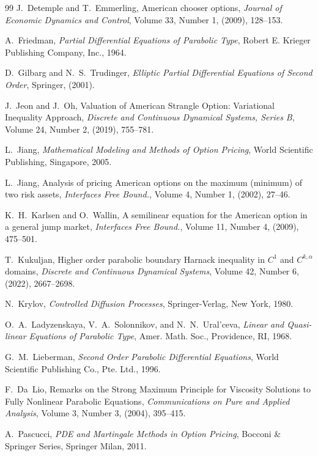 \documentclass[11pt, a4paper, leqno]{amsart}
\numberwithin{equation}{section}
\theoremstyle{plain}
\theoremstyle{definition}
\theoremstyle{remark}
\begin{document}
\begin{thebibliography}{99}
	J.~Detemple and T.~Emmerling, {American chooser options}, \textit{Journal of Economic Dynamics and Control}, Volume 33, Number 1, (2009), 128--153.
	
	A.~Friedman, \textit{Partial Differential Equations of Parabolic Type}, Robert E. Krieger Publishing Company, Inc., 1964.

	
	D.~Gilbarg and N.~S.~Trudinger, \textit{Elliptic Partial Differential Equations of Second Order}, Springer, (2001).
	
	J.~Jeon and J.~Oh, Valuation of American Strangle Option: Variational Inequality Approach, \textit{Discrete and Continuous Dynamical Systems, Series B}, Volume 24, Number 2, (2019), 755--781.
	
	L.~Jiang, \textit{Mathematical Modeling and Methods of Option Pricing}, World Scientific Publishing, Singapore, 2005.
	
	L.~Jiang, Analysis of pricing American options on the maximum (minimum) of two risk assets, \textit{Interfaces Free Bound.}, Volume 4, Number 1, (2002), 27--46.
	
	K.~H.~Karlsen and O.~Wallin, A semilinear equation for the American option in a general jump market, \textit{Interfaces Free Bound.}, Volume 11, Number 4, (2009), 475--501.

	T.~Kukuljan, Higher order parabolic boundary Harnack inequality in $C^1$ and $C^{k,\alpha}$ domains, \textit{Discrete and Continuous Dynamical Systems}, Volume 42, Number 6, (2022), 2667--2698.
	
	N.~Krylov, \textit{Controlled Diffusion Processes}, Springer-Verlag, New York, 1980.
	
	O.~A.~Ladyzenskaya, V.~A.~Solonnikov, and N.~N.~Ural’ceva, \textit{Linear and Quasi-linear Equations of Parabolic Type}, Amer. Math. Soc., Providence, RI, 1968.

	
	G.~M.~Lieberman, \textit{Second Order Parabolic Differential Equations}, World Scientific Publishing Co., Pte. Ltd., 1996.
	
	{F.~Da~Lio}, Remarks on the Strong Maximum Principle for Viscosity Solutions to Fully Nonlinear Parabolic Equations, \textit{Communications on Pure and Applied Analysis}, Volume 3, Number 3, (2004), 395--415.
	
	A.~Pascucci, \textit{PDE and Martingale Methods in Option Pricing}, Bocconi \& Springer Series, Springer Milan, 2011.
	

\end{thebibliography}
\end{document}
